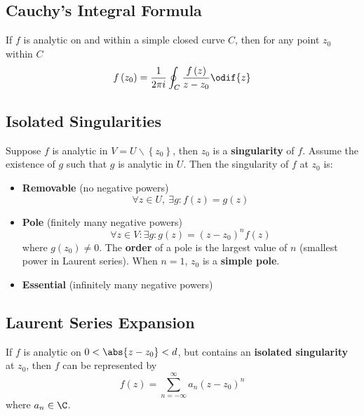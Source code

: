 \documentclass{article}
\begin{document}
\begin{multicols*}{3}
    \subsection{Cauchy's Integral Formula}
    If \(f\) is analytic on and within a simple closed curve \(C\),
    then for any point \(z_0\) within \(C\)
    \begin{equation*}
        f\left( z_0 \right) = \frac{1}{2 \pi i} \oint_C \frac{f\left( z \right)}{z - z_0} \odif{z}
    \end{equation*}
    \subsection{Isolated Singularities}
    Suppose \(f\) is analytic in \(V = U\backslash\left\{ z_0 \right\}\), then \(z_0\) is a \textbf{singularity} of \(f\).
    Assume the existence of \(g\) such that \(g\) is analytic in \(U\). Then the singularity of \(f\) at \(z_0\) is:
    \begin{itemize}
        \item \textbf{Removable} (no negative powers)
              \begin{equation*}
                  \forall z \in U,\: \exists g : f\left( z \right) = g\left( z \right)
              \end{equation*}
        \item \textbf{Pole} (finitely many negative powers)
              \begin{equation*}
                  \forall z \in V : \exists g : g\left( z \right) = \left( z - z_0 \right)^n f\left( z \right)
              \end{equation*}
              where \(g\left( z_0 \right) \neq 0\).
              The \textbf{order} of a pole is the largest value of \(n\)
              (smallest power in Laurent series). When \(n = 1\), \(z_0\) is a \textbf{simple pole}.
        \item \textbf{Essential} (infinitely many negative powers)
    \end{itemize}
    \subsection{Laurent Series Expansion}
    If \(f\) is analytic on \(0 < \abs{z - z_0} < d\), but contains
    an \textbf{isolated singularity} at \(z_0\), then \(f\) can be
    represented by
    \begin{equation*}
        f\left( z \right) = \sum_{n = -\infty}^\infty a_n \left( z - z_0 \right)^n
    \end{equation*}
    where \(a_n \in \C\).

\end{multicols*}
\end{document}
